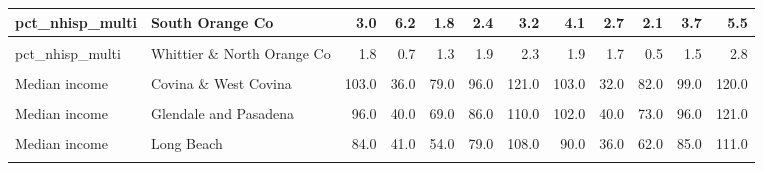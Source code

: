 \begin{table}[!h]
\begin{tabular}[t]{l|>{}l||r|r|r|r|r|r|r|r|r|r}
\hline
pct\_nhisp\_multi & South Orange Co & 3.0 & 6.2 & 1.8 & 2.4 & 3.2 & 4.1 & 2.7 & 2.1 & 3.7 & 5.5\\
\hline
\cellcolor{gray!6}{pct\_nhisp\_multi} & \cellcolor{gray!6}{West Los Angeles \& West Beach} & \cellcolor{gray!6}{3.2} & \cellcolor{gray!6}{1.3} & \cellcolor{gray!6}{2.4} & \cellcolor{gray!6}{3.1} & \cellcolor{gray!6}{3.9} & \cellcolor{gray!6}{4.8} & \cellcolor{gray!6}{2.9} & \cellcolor{gray!6}{2.7} & \cellcolor{gray!6}{4.2} & \cellcolor{gray!6}{6.7}\\
\hline
pct\_nhisp\_multi & Whittier \& North Orange Co & 1.8 & 0.7 & 1.3 & 1.9 & 2.3 & 1.9 & 1.7 & 0.5 & 1.5 & 2.8\\
\hline
\cellcolor{gray!6}{Median income} & \cellcolor{gray!6}{Anaheim} & \cellcolor{gray!6}{104.0} & \cellcolor{gray!6}{42.0} & \cellcolor{gray!6}{78.0} & \cellcolor{gray!6}{94.0} & \cellcolor{gray!6}{119.0} & \cellcolor{gray!6}{108.0} & \cellcolor{gray!6}{41.0} & \cellcolor{gray!6}{78.0} & \cellcolor{gray!6}{99.0} & \cellcolor{gray!6}{129.0}\\
\hline
\hline
Median income & Covina \& West Covina & 103.0 & 36.0 & 79.0 & 96.0 & 121.0 & 103.0 & 32.0 & 82.0 & 99.0 & 120.0\\
\hline
\cellcolor{gray!6}{Median income} & \cellcolor{gray!6}{East Los Angeles} & \cellcolor{gray!6}{70.0} & \cellcolor{gray!6}{26.0} & \cellcolor{gray!6}{53.0} & \cellcolor{gray!6}{64.0} & \cellcolor{gray!6}{81.0} & \cellcolor{gray!6}{76.0} & \cellcolor{gray!6}{25.0} & \cellcolor{gray!6}{60.0} & \cellcolor{gray!6}{72.0} & \cellcolor{gray!6}{87.0}\\
\hline
Median income & Glendale and Pasadena & 96.0 & 40.0 & 69.0 & 86.0 & 110.0 & 102.0 & 40.0 & 73.0 & 96.0 & 121.0\\
\hline
\cellcolor{gray!6}{Median income} & \cellcolor{gray!6}{Hollywood \& Wilshire} & \cellcolor{gray!6}{68.0} & \cellcolor{gray!6}{42.0} & \cellcolor{gray!6}{41.0} & \cellcolor{gray!6}{57.0} & \cellcolor{gray!6}{86.0} & \cellcolor{gray!6}{84.0} & \cellcolor{gray!6}{43.0} & \cellcolor{gray!6}{52.0} & \cellcolor{gray!6}{75.0} & \cellcolor{gray!6}{105.0}\\
\hline
Median income & Long Beach & 84.0 & 41.0 & 54.0 & 79.0 & 108.0 & 90.0 & 36.0 & 62.0 & 85.0 & 111.0\\
\hline
\cellcolor{gray!6}{Median income} & \cellcolor{gray!6}{Riverside, San Bernardino, \& Ontario} & \cellcolor{gray!6}{89.0} & \cellcolor{gray!6}{36.0} & \cellcolor{gray!6}{64.0} & \cellcolor{gray!6}{81.0} & \cellcolor{gray!6}{111.0} & \cellcolor{gray!6}{95.0} & \cellcolor{gray!6}{37.0} & \cellcolor{gray!6}{68.0} & \cellcolor{gray!6}{88.0} & \cellcolor{gray!6}{119.0}\\

\end{tabular}
\end{table}
